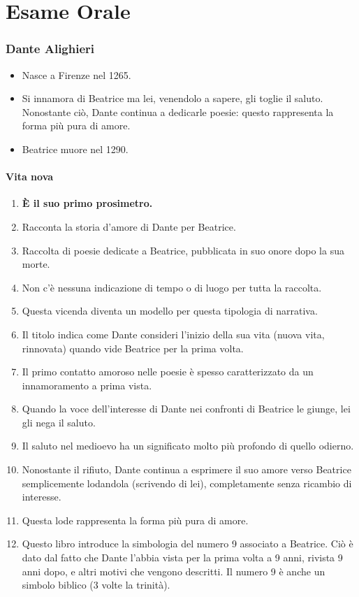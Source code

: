 \documentclass{article}
\begin{document}

\newpage

\part{Esame Orale}

\section{Dante Alighieri}

\begin{itemize}
    \item Nasce a Firenze nel 1265.
    \item Si innamora di Beatrice ma lei, venendolo a sapere, gli toglie il saluto. Nonostante ciò, Dante continua a dedicarle poesie: questo rappresenta la forma più pura di amore.
    \item Beatrice muore nel 1290.
\end{itemize}

\subsection{Vita nova}

\begin{enumerate}
    \item \textbf{È il suo primo prosimetro.}
    \item Racconta la storia d'amore di Dante per Beatrice.
    \item Raccolta di poesie dedicate a Beatrice, pubblicata in suo onore dopo la sua morte.
    \item Non c'è nessuna indicazione di tempo o di luogo per tutta la raccolta.
    \item Questa vicenda diventa un modello per questa tipologia di narrativa.
    \item Il titolo indica come Dante consideri l’inizio della sua vita (nuova vita, rinnovata) quando vide Beatrice per la prima volta.
    \item Il primo contatto amoroso nelle poesie è spesso caratterizzato da un innamoramento a prima vista.
    \item Quando la voce dell’interesse di Dante nei confronti di Beatrice le giunge, lei gli nega il saluto.
    \item Il saluto nel medioevo ha un significato molto più profondo di quello odierno.
    \item Nonostante il rifiuto, Dante continua a esprimere il suo amore verso Beatrice semplicemente lodandola (scrivendo di lei), completamente senza ricambio di interesse.
    \item Questa lode rappresenta la forma più pura di amore.
    \item Questo libro introduce la simbologia del numero 9 associato a Beatrice. Ciò è dato dal fatto che Dante l’abbia vista per la prima volta a 9 anni, rivista 9 anni dopo, e altri motivi che vengono descritti. Il numero 9 è anche un simbolo biblico (3 volte la trinità).
\end{enumerate}
\end{document}
